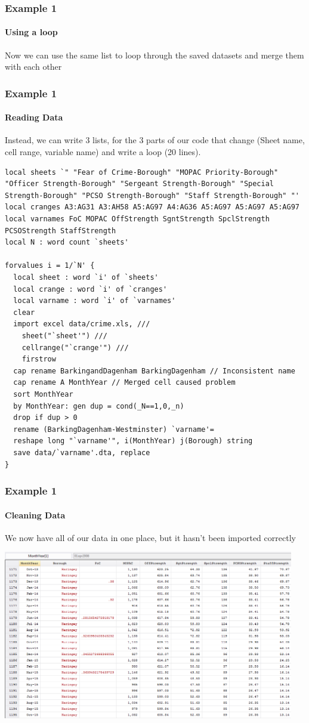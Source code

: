 \documentclass{beamer}
\begin{document}
\begin{frame}[fragile]
  \frametitle{Example 1}
  \framesubtitle{Using a loop}
  Now we can use the same list to loop through the saved datasets and merge them with each other
\end{frame}

\begin{frame}[fragile]
  \frametitle{Example 1}
  \framesubtitle{Reading Data}
Instead, we can write 3 lists, for the 3 parts of our code that change (Sheet name, cell range, variable name) and write a loop (20 lines).

\tiny
\begin{verbatim}
local sheets `" "Fear of Crime-Borough" "MOPAC Priority-Borough" "Officer Strength-Borough" "Sergeant Strength-Borough" "Special Strength-Borough" "PCSO Strength-Borough" "Staff Strength-Borough" "'	
local cranges A3:AG31 A3:AH58 A5:AG97 A4:AG36 A5:AG97 A5:AG97 A5:AG97
local varnames FoC MOPAC OffStrength SgntStrength SpclStrength PCSOStrength StaffStrength
local N : word count `sheets'

forvalues i = 1/`N' {
  local sheet : word `i' of `sheets'
  local crange : word `i' of `cranges'
  local varname : word `i' of `varnames'
  clear   
  import excel data/crime.xls, ///
    sheet("`sheet'") ///
    cellrange("`crange'") ///
    firstrow	
  cap rename BarkingandDagenham BarkingDagenham // Inconsistent name
  cap rename A MonthYear // Merged cell caused problem	
  sort MonthYear
  by MonthYear: gen dup = cond(_N==1,0,_n)
  drop if dup > 0
  rename (BarkingDagenham-Westminster) `varname'=
  reshape long "`varname'", i(MonthYear) j(Borough) string
  save data/`varname'.dta, replace
}
\end{verbatim}

\end{frame}

\begin{frame}
  \frametitle{Example 1}
  \framesubtitle{Cleaning Data}
We now have all of our data in one place, but it hasn't been imported correctly

\includegraphics[width=5in]{data2.PNG}

\end{frame}
\end{document}
